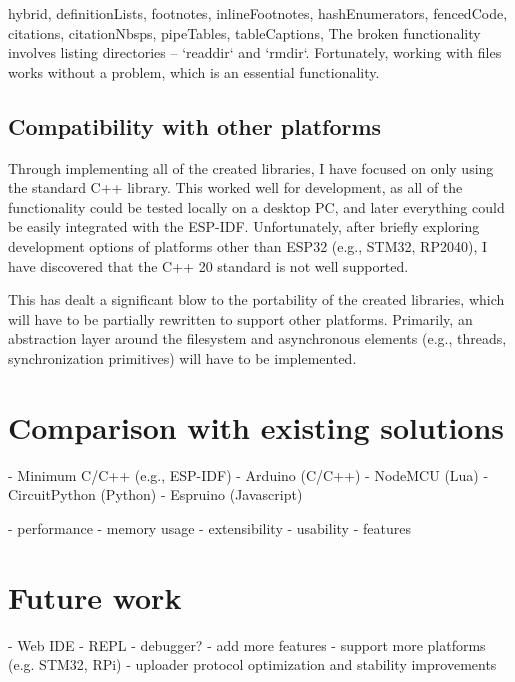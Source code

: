 \documentclass[
  digital,
  oneside,
  nosansbold,
  nocolorbold,
  lof,
  lot
]{fithesis4}
\begin{document}
\begin{markdown*}{%
  hybrid,
  definitionLists,
  footnotes,
  inlineFootnotes,
  hashEnumerators,
  fencedCode,
  citations,
  citationNbsps,
  pipeTables,
  tableCaptions,
}
The broken functionality involves listing directories -- `readdir` and `rmdir`. Fortunately, working with files works without a problem, which is an essential functionality.


\section{Compatibility with other platforms}

Through implementing all of the created libraries, I have focused on only using the standard C++ library. This worked well for development, as all of the functionality could be tested locally on a desktop PC, and later everything could be easily integrated with the ESP-IDF. Unfortunately, after briefly exploring development options of platforms other than ESP32 (e.g., STM32, RP2040), I have discovered that the C++ 20 standard is not well supported.

This has dealt a significant blow to the portability of the created libraries, which will have to be partially rewritten to support other platforms. Primarily, an abstraction layer around the filesystem and asynchronous elements (e.g., threads, synchronization primitives) will have to be implemented.


\chapter{Comparison with existing solutions}

  - Minimum C/C++ (e.g., ESP-IDF)
  - Arduino (C/C++)
  - NodeMCU (Lua)
  - CircuitPython (Python)
  - Espruino (Javascript)

  - performance
  - memory usage
  - extensibility
  - usability
  - features


\chapter{Future work}

  - Web IDE
  - REPL
  - debugger?
  - add more features
  - support more platforms (e.g. STM32, RPi)
  - uploader protocol optimization and stability improvements

\end{markdown*}
\end{document}

